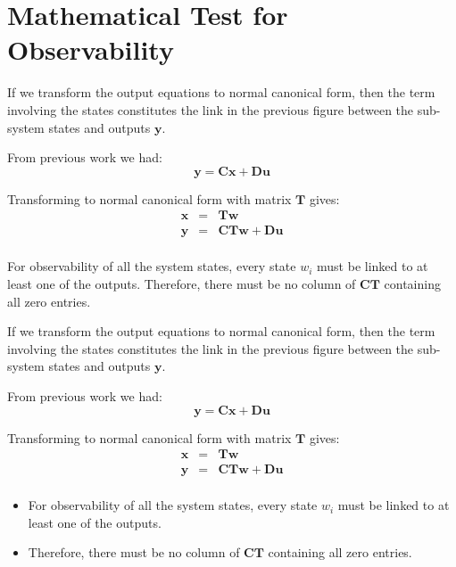 
\section*{Mathematical Test for Observability} %
\label{sec:mathematical_test_for_observability}

If we transform the output equations to normal canonical form, then the term involving the states constitutes the link in the previous figure between the sub-system states and outputs $\mathbf{y}$.

From previous work we had:
\[
\mathbf{y} = \mathbf{Cx} + \mathbf{Du}
\]
 
Transforming to normal canonical form with matrix $\mathbf{T}$ gives:
\begin{eqnarray*}
	\mathbf{x} & = & \mathbf{Tw} \\
	\mathbf{y}& = &\mathbf{CTw}+\mathbf{Du} \\
\end{eqnarray*}

For observability of all the system states, every state $w_i$ must be linked to at least one of the outputs.  Therefore, there must be no column of $\mathbf{CT}$  containing all zero entries.
\ifslidesonly
\begin{slide}
If we transform the output equations to normal canonical form, then the term involving the states constitutes the link in the previous figure between the sub-system states and outputs $\mathbf{y}$.

From previous work we had:
\[
\mathbf{y} = \mathbf{Cx} + \mathbf{Du}
\]

Transforming to normal canonical form with matrix $\mathbf{T}$ gives:
\begin{eqnarray*}
	\mathbf{x} & = & \mathbf{Tw} \\
	\mathbf{y}& = &\mathbf{CTw}+\mathbf{Du} \\
\end{eqnarray*}
\end{slide}
\begin{slide}
\begin{itemize}
	\item For observability of all the system states, every state $w_i$ must be linked to at least one of the outputs.
	\item Therefore, there must be no column of $\mathbf{CT}$  containing all zero entries.   
\end{itemize}
\end{slide}
\fi

